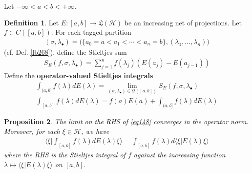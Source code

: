 \documentclass[12pt,b5paper,notitlepage]{article}
\theoremstyle{definition}
\newtheorem{df}{Definition}[subsection]
\theoremstyle{plain}
\newtheorem{pp}[df]{Proposition}
\newcommand{\fk}{\mathfrak}
\newcommand{\mc}{\mathcal}
\newcommand{\bk}[1]{\langle {#1}\rangle}
\newcommand{\Bigbk}[1]{\Big\langle {#1}\Big\rangle}
\newcommand{\blt}{\bullet}
\newcommand{\MH}{\mathcal H}
\numberwithin{equation}{section}
\begin{document}
Let $-\infty<a<b<+\infty$.

\begin{df}
Let $E:[a,b]\rightarrow\fk L(\mc H)$ be an increasing net of projections. Let $f\in C([a,b])$. For each tagged partition 
\begin{align*}
(\sigma,\lambda_\blt)=\big(\{a_0=a<a_1<\cdots<a_n=b\},(\lambda_1,\dots,\lambda_n) \big)
\end{align*}
(cf. Def. \ref{lb268}), define the Stieltjes sum
\begin{align*}
S_E(f,\sigma,\lambda_\blt)=\sum_{j=1}^n f(\lambda_j)(E(a_j)-E(a_{j-1}))
\end{align*}
Define the \textbf{operator-valued Stieltjes integrals}
\begin{gather}
\int_{(a,b]} f(\lambda)dE(\lambda)=\lim_{(\sigma,\lambda_\blt)\in\mc Q([a,b])}S_E(f,\sigma,\lambda_\blt)\label{eq148}\\
\int_{[a,b]} f(\lambda)dE(\lambda)=f(a)E(a)+\int_{(a,b]} f(\lambda)dE(\lambda)
\end{gather}
\end{df}

\begin{pp}\label{lb282}
The limit on the RHS of \eqref{eq148} converges in the operator norm. Moreover, for each $\xi\in\MH$, we have
\begin{align}\label{eq159}
\Bigbk{\xi\Big|\int_{[a,b]}f(\lambda)dE(\lambda)\xi}=\int_{[a,b]}f(\lambda)d\bk{\xi|E(\lambda)\xi}
\end{align}
where the RHS is the Stieltjes integral of $f$ against the increasing function $\lambda\mapsto\bk{\xi|E(\lambda)\xi}$ on $[a,b]$.
\end{pp}
\end{document}
